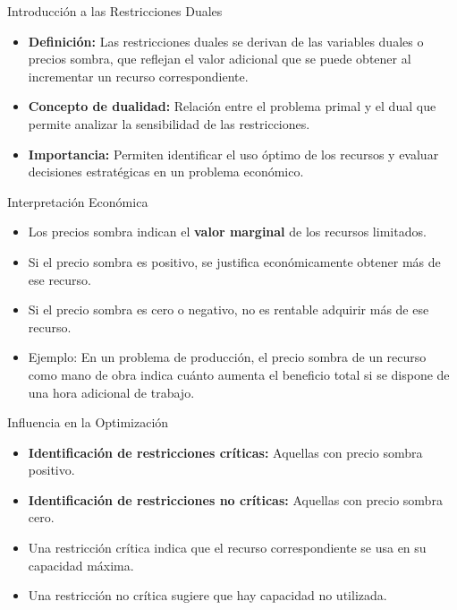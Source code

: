 \documentclass{beamer}
\begin{document}
\begin{frame}{Introducción a las Restricciones Duales}
    \begin{itemize}
        \item \textbf{Definición:} Las restricciones duales se derivan de las variables duales o precios sombra, que reflejan el valor adicional que se puede obtener al incrementar un recurso correspondiente.
        \item \textbf{Concepto de dualidad:} Relación entre el problema primal y el dual que permite analizar la sensibilidad de las restricciones.
        \item \textbf{Importancia:} Permiten identificar el uso óptimo de los recursos y evaluar decisiones estratégicas en un problema económico.
    \end{itemize}
\end{frame}

\begin{frame}{Interpretación Económica}
    \begin{itemize}
        \item Los precios sombra indican el \textbf{valor marginal} de los recursos limitados.
        \item Si el precio sombra es positivo, se justifica económicamente obtener más de ese recurso.
        \item Si el precio sombra es cero o negativo, no es rentable adquirir más de ese recurso.
        \item Ejemplo: En un problema de producción, el precio sombra de un recurso como mano de obra indica cuánto aumenta el beneficio total si se dispone de una hora adicional de trabajo.
    \end{itemize}
\end{frame}

\begin{frame}{Influencia en la Optimización}
    \begin{itemize}
        \item \textbf{Identificación de restricciones críticas:} Aquellas con precio sombra positivo.
        \item \textbf{Identificación de restricciones no críticas:} Aquellas con precio sombra cero.
        \item Una restricción crítica indica que el recurso correspondiente se usa en su capacidad máxima.
        \item Una restricción no crítica sugiere que hay capacidad no utilizada.
    \end{itemize}
\end{frame}
\end{document}
